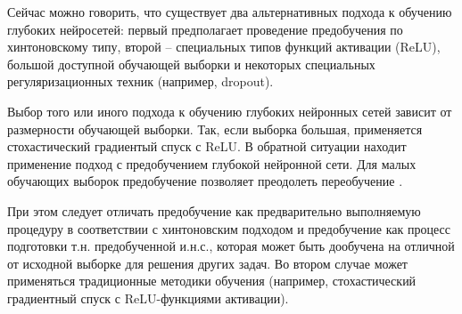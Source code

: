 Сейчас можно говорить, что существует два альтернативных подхода к обучению глубоких нейросетей: первый предполагает проведение предобучения по хинтоновскому типу, второй -- специальных типов функций активации (ReLU), большой доступной обучающей выборки и некоторых специальных регуляризационных техник (например, dropout).

Выбор того или иного подхода к обучению глубоких нейронных сетей зависит от размерности обучающей выборки. Так, если выборка большая, применяется стохастический градиентый спуск с ReLU. В обратной ситуации находит применение подход с предобучением глубокой нейронной сети. Для малых обучающих выборок предобучение позволяет преодолеть переобучение .

При этом следует отличать предобучение как предварительно выполняемую процедуру в соответствии с хинтоновским подходом и предобучение как процесс подготовки т.н. предобученной и.н.с., которая может быть дообучена на отличной от исходной выборке для решения других задач. Во втором случае может применяться традиционные методики обучения (например, стохастический градиентный спуск с ReLU-функциями активации).

%
%
%



%